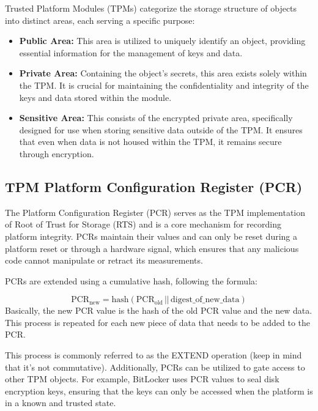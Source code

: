 Trusted Platform Modules (TPMs) categorize the storage structure of
objects into distinct areas, each serving a specific purpose:

\begin{itemize}
  \item \textbf{Public Area:} This area is utilized to uniquely
    identify an object, providing essential information for the
    management of keys and data.

  \item \textbf{Private Area:} Containing the object's secrets, this
    area exists solely within the TPM. It is crucial for maintaining
    the confidentiality and integrity of the keys and data stored
    within the module.

  \item \textbf{Sensitive Area:} This consists of the encrypted
    private area, specifically designed for use when storing sensitive
    data outside of the TPM. It ensures that even when data is not
    housed within the TPM, it remains secure through encryption.
\end{itemize}

\subsection{TPM Platform Configuration Register (PCR)}

The Platform Configuration Register (PCR) serves as the TPM
implementation of Root of Trust for Storage (RTS) and is a core
mechanism for recording platform integrity. PCRs maintain their values
and can only be reset during a platform reset or through a hardware
signal, which ensures that any malicious code cannot manipulate or
retract its measurements.

PCRs are extended using a cumulative hash, following the formula:

\[
\text{PCR}_{\text{new}} = \text{hash}(\text{PCR}_{\text{old}} \, || \, \text{digest\_of\_new\_data})
\]
Basically, the new PCR value is the hash of the old PCR value and the 
new data. This process is repeated for each new piece of data that
needs to be added to the PCR.

This process is commonly referred to as the EXTEND operation (keep in
mind that it's not commutative).
Additionally, PCRs can be utilized to gate access to other TPM
objects. For example, BitLocker uses PCR values to seal disk
encryption keys, ensuring that the keys can only be accessed when the
platform is in a known and trusted state.

